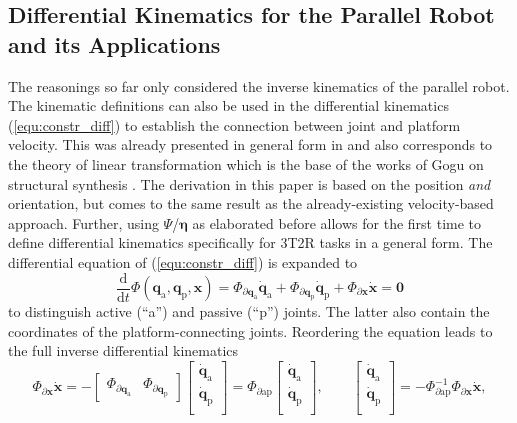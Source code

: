 \documentclass[robotics,article,submit,moreauthors,pdftex]{Definitions/mdpi}
\newcommand{\bm}[1]{\boldsymbol{#1}}
\let\Phi\varPhi
\let\Psi\varPsi
\begin{document}
\subsection{Differential Kinematics for the Parallel Robot and its Applications}
\label{sec:ZB_Anwendung_PKM_DiffKin}

The reasonings so far only considered the inverse kinematics of the parallel robot.
The kinematic definitions can also be used in the differential kinematics (\ref{equ:constr_diff}) to establish the connection between joint and platform velocity.
This was already presented in general form in \cite{Merlet2006} and also corresponds to the theory of linear transformation which is the base of the works of Gogu on structural synthesis \cite{Gogu2008}.
The derivation in this paper is based on the position \emph{and} orientation, but comes to the same result as the already-existing velocity-based approach.
Further, using $\bm{\Psi}$/$\bm{\eta}$ as elaborated before allows for the first time to define differential kinematics specifically for 3T2R tasks in a general form.
The differential equation of (\ref{equ:constr_diff}) is expanded to 
\begin{equation}
\frac{\mathrm{d}}{\mathrm{d}t} \bm{\Phi}(\bm{q}_{\mathrm{a}}, \bm{q}_{\mathrm{p}},\bm{x})
=
\bm{\Phi}_{\partial\bm{q}_{\mathrm{a}}} \dot{\bm{q}}_{\mathrm{a}} + \bm{\Phi}_{\partial\bm{q}_{\mathrm{p}}} \dot{\bm{q}}_{\mathrm{p}} + \bm{\Phi}_{\partial\bm{x}} \dot{\bm{x}} 
=
\bm{0}
\label{equ:constr_diff_qap}
\end{equation}
to distinguish active (``a'') and passive (``p'') joints.
The latter also contain the coordinates of the platform-connecting joints.
Reordering the equation leads to the full inverse differential kinematics
\begin{equation}
\bm{\Phi}_{\partial\bm{x}} \dot{\bm{x}}
=
- 
\begin{bmatrix} \bm{\Phi}_{\partial\bm{q}_{\mathrm{a}}} & \bm{\Phi}_{\partial\bm{q}_{\mathrm{p}}}\end{bmatrix}
\begin{bmatrix}
\dot{\bm{q}}_{\mathrm{a}} \\
\dot{\bm{q}}_{\mathrm{p}} \\
\end{bmatrix}
=
\bm{\Phi}_{\partial\mathrm{ap}}
\begin{bmatrix}
\dot{\bm{q}}_{\mathrm{a}} \\
\dot{\bm{q}}_{\mathrm{p}} \\
\end{bmatrix},
\quad\quad
\begin{bmatrix}
\dot{\bm{q}}_{\mathrm{a}} \\
\dot{\bm{q}}_{\mathrm{p}} \\
\end{bmatrix}
=
-\bm{\Phi}_{\partial\mathrm{ap}}^{-1} \bm{\Phi}_{\partial\bm{x}}
\dot{\bm{x}},
\label{equ:full_diff_ik}
\end{equation}
\end{document}
